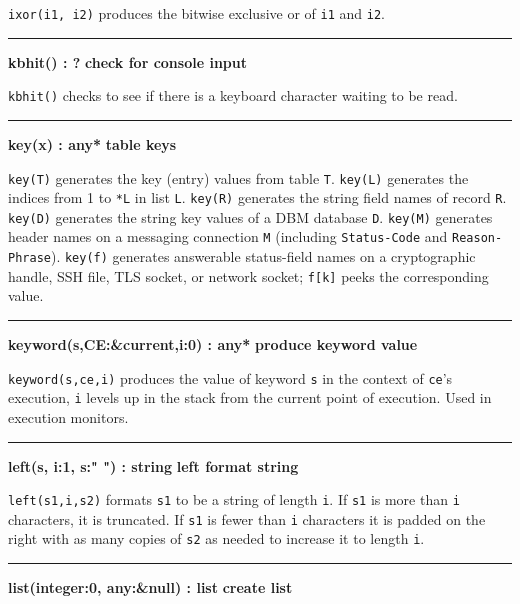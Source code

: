 \noindent
\texttt{ixor(i1, i2)} produces the bitwise exclusive
or of \texttt{i1} and \texttt{i2}.

\bigskip\hrule\vspace{0.1cm}
\noindent
{\bf kbhit() : ? } \hfill {\bf check for console input}

\noindent
{}\texttt{kbhit()} checks to see if there is a
keyboard character waiting to be read.

\bigskip\hrule\vspace{0.1cm}
\noindent
{\bf key(x) : any* } \hfill {\bf table keys}\WarningNotThreadSafe

\noindent
{}\texttt{key(T)} generates the key (entry) values from
table \texttt{T}. \texttt{key(L)} generates the indices from 1 to
\texttt{*L} in list \texttt{L}. \texttt{key(R)} generates the string
field names of record \texttt{R}.
\texttt{key(D)} generates the string key values of a DBM database \texttt{D}.
\texttt{key(M)} generates header names on a messaging connection
\texttt{M} (including \texttt{Status-Code} and \texttt{Reason-Phrase}).
\texttt{key(f)} generates answerable status-field names on a cryptographic
handle, SSH file, TLS socket, or network socket; \texttt{f[k]} peeks
the corresponding value.

\bigskip\hrule\vspace{0.1cm}
\noindent
{\bf keyword(s,CE:\&current,i:0) : any* } \hfill {\bf produce keyword value}

\noindent
{}\texttt{keyword(s,ce,i)} produces the value of keyword
\texttt{s} in the context of \texttt{ce}'s execution,
\texttt{i} levels up in the stack from the current point of execution.
Used in execution monitors.

\bigskip\hrule\vspace{0.1cm}
\noindent
{\bf left(s, i:1, s:" ") : string } \hfill {\bf left format string}

\noindent
{}\texttt{left(s1,i,s2)} formats \texttt{s1} to be a string
of length \texttt{i}. If \texttt{s1} is more than \texttt{i}
characters, it is truncated. If \texttt{s1} is fewer than \texttt{i}
characters it is padded on the right with as many copies of \texttt{s2}
as needed to increase it to length \texttt{i}.

\bigskip\hrule\vspace{0.1cm}
\noindent
{\bf list(integer:0, any:\&null) : list } \hfill {\bf create list}

